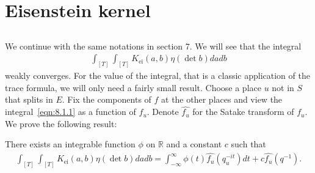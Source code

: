 \section{Eisenstein kernel}

\subsection{}
We continue with the same notations in section 7.
We will see that the integral
\begin{align}
\label{eqn:8.1.1}
    \int_{[T]}\int_{[T]} K_{\mathrm{ei}}(a, b) \eta(\det b) dadb
\end{align}
weakly converges.
For the value of the integral, that is a classic application of the trace formula, we will only need a fairly small result.
Choose a place $u$ not in $S$ that splits in $E$.
Fix the components of $f$ at the other places and view the integral~\eqref{eqn:8.1.1} as a function of $f_u$.
Denote $\hat{f_u}$ for the Satake transform of $f_u$.
We prove the following result:
\begin{proposition}\label{prop:8.1}
There exists an integrable function $\phi$ on $\mathbb{R}$ and a constant $c$ such that
\begin{align}
    \int_{[T]} \int_{[T]} K_{\mathrm{ei}}(a, b) \eta(\det b) dadb = \int_{-\infty}^{\infty} \phi(t) \hat{f_u}(q_{u}^{-it}) dt + c \hat{f_u}(q^{-1}).
\end{align}
\end{proposition}


